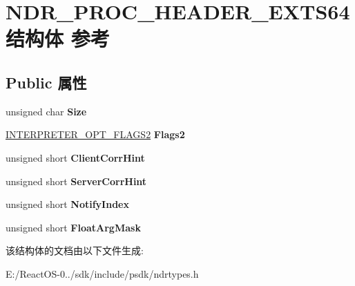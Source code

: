 \hypertarget{struct_n_d_r___p_r_o_c___h_e_a_d_e_r___e_x_t_s64}{}\section{N\+D\+R\+\_\+\+P\+R\+O\+C\+\_\+\+H\+E\+A\+D\+E\+R\+\_\+\+E\+X\+T\+S64结构体 参考}
\label{struct_n_d_r___p_r_o_c___h_e_a_d_e_r___e_x_t_s64}
\subsection*{Public 属性}
\begin{DoxyCompactItemize}
\item 
\mbox{\label{struct_n_d_r___p_r_o_c___h_e_a_d_e_r___e_x_t_s64_ae813d1701ca8a751b9c9496a7bea8044}} 
unsigned char {\bfseries Size}
\item 
\mbox{\label{struct_n_d_r___p_r_o_c___h_e_a_d_e_r___e_x_t_s64_a26ea23b31932378178c55b461c357093}} 
\hyperlink{struct_i_n_t_e_r_p_r_e_t_e_r___o_p_t___f_l_a_g_s2}{I\+N\+T\+E\+R\+P\+R\+E\+T\+E\+R\+\_\+\+O\+P\+T\+\_\+\+F\+L\+A\+G\+S2} {\bfseries Flags2}
\item 
\mbox{\label{struct_n_d_r___p_r_o_c___h_e_a_d_e_r___e_x_t_s64_a03e451c8af3c42b7d35c06b88bfe9549}} 
unsigned short {\bfseries Client\+Corr\+Hint}
\item 
\mbox{\label{struct_n_d_r___p_r_o_c___h_e_a_d_e_r___e_x_t_s64_a8eab43fd7c06878882178c4b2db9d86f}} 
unsigned short {\bfseries Server\+Corr\+Hint}
\item 
\mbox{\label{struct_n_d_r___p_r_o_c___h_e_a_d_e_r___e_x_t_s64_a4c4bac89a6862cc9143d38989d2eb06a}} 
unsigned short {\bfseries Notify\+Index}
\item 
\mbox{\label{struct_n_d_r___p_r_o_c___h_e_a_d_e_r___e_x_t_s64_a05c3f658430fdb81b2ddb2acb214c648}} 
unsigned short {\bfseries Float\+Arg\+Mask}
\end{DoxyCompactItemize}


该结构体的文档由以下文件生成\+:\begin{DoxyCompactItemize}
\item 
E\+:/\+React\+O\+S-\/0../sdk/include/psdk/ndrtypes.\+h\end{DoxyCompactItemize}
